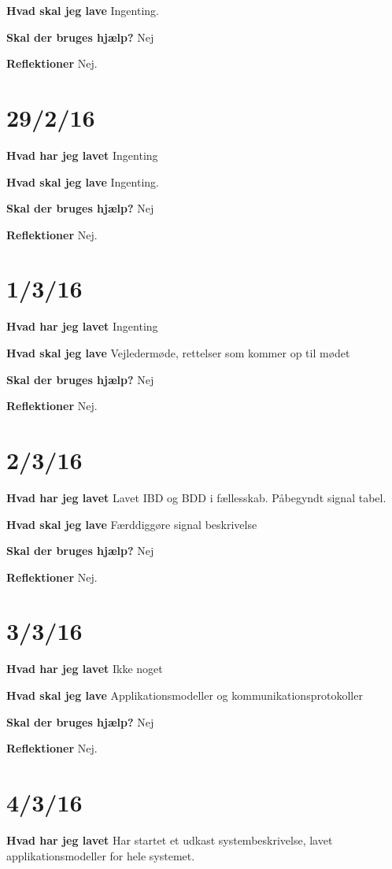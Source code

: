 \documentclass{article}
\begin{document}
	\textbf{Hvad skal jeg lave}
	Ingenting. 
	
	\textbf{Skal der bruges hjælp?}
	Nej
	
	\textbf{Reflektioner}
	Nej.		
	
	
	\section{29/2/16}
	\textbf{Hvad har jeg lavet}
	Ingenting
	
	\textbf{Hvad skal jeg lave}
	Ingenting. 
	
	\textbf{Skal der bruges hjælp?}
	Nej
	
	\textbf{Reflektioner}
	Nej.	
	
	\section{1/3/16}
	\textbf{Hvad har jeg lavet}
	Ingenting
	
	\textbf{Hvad skal jeg lave}
	Vejledermøde, rettelser som kommer op til mødet
	
	\textbf{Skal der bruges hjælp?}
	Nej
	
	\textbf{Reflektioner}
	Nej.	
	
	\section{2/3/16}
	\textbf{Hvad har jeg lavet}
	Lavet IBD og BDD i fællesskab. Påbegyndt signal tabel.
	
	\textbf{Hvad skal jeg lave}
	Færddiggøre signal beskrivelse
	
	\textbf{Skal der bruges hjælp?}
	Nej
	
	\textbf{Reflektioner}
	Nej.	
	
	\section{3/3/16}
	\textbf{Hvad har jeg lavet}
	Ikke noget
	
	\textbf{Hvad skal jeg lave}
	Applikationsmodeller og kommunikationsprotokoller
	
	\textbf{Skal der bruges hjælp?}
	Nej
	
	\textbf{Reflektioner}
	Nej.			
	
	\section{4/3/16}
	\textbf{Hvad har jeg lavet}
	Har startet et udkast systembeskrivelse, lavet applikationsmodeller for hele systemet.
	
\end{document}
